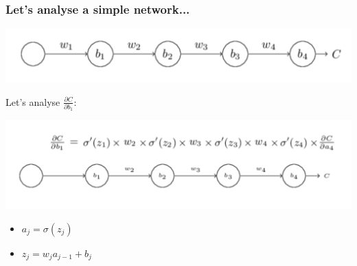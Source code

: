 \documentclass[usenames,dvipsnames]{beamer}
\begin{document}
\begin{frame}
  \frametitle{Let's analyse a simple network...}
  
  \centering
  	\includegraphics[scale=.3]{simple-net}
  	
  	\flushleft
  	Let's analyse $\frac{\partial C}{\partial b_1}$:
  	
  \centering
    	\includegraphics[scale=.5]{deriv-chain}
    	
    	\flushleft
  \begin{itemize}
  \item $a_j = \sigma(z_{j})$
  \item $z_j = w_j a_{j-1} + b_j$
\end{itemize}

  
\end{frame}
\end{document}
